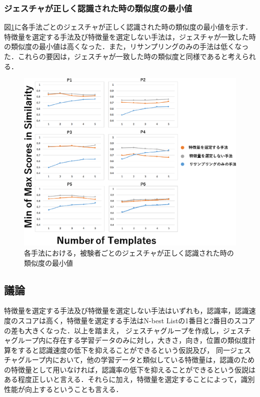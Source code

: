 \newpage
\subsubsection{ジェスチャが正しく認識された時の類似度の最小値}
図\ref{fig:rare_min}に各手法ごとのジェスチャが正しく認識された時の類似度の最小値を示す．
特徴量を選定する手法及び特徴量を選定しない手法は，ジェスチャが一致した時の類似度の最小値は高くなった．また，リサンプリングのみの手法は低くなった．これらの要因は，ジェスチャが一致した時の類似度と同様であると考えられる．

\begin{figure}[!h]
\centering
\includegraphics[width=1.0\columnwidth]{img/pre_min.eps}
\caption{各手法における，被験者ごとのジェスチャが正しく認識された時の類似度の最小値}
\label{fig:rare_min}
\end{figure}

\newpage
\subsection{議論}

特徴量を選定する手法及び特徴量を選定しない手法はいずれも，認識率，認識速度のスコアは高く，特徴量を選定する手法はN-best Listの1番目と2番目のスコアの差も大きくなった．以上を踏まえ，
ジェスチャグループを作成し，ジェスチャグループ内に存在する学習データのみに対し，大きさ，向き，位置の類似度計算をすると認識速度の低下を抑えることができるという仮説及び，
同一ジェスチャグループ内において，他の学習データと類似している特徴量は，認識のための特徴量として用いなければ，認識率の低下を抑えることができるという仮説はある程度正しいと言える．それらに加え，特徴量を選定することによって，識別性能が向上するということも言える．

